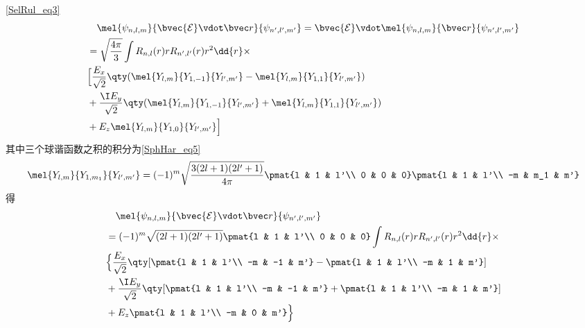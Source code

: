 

\autoref{SelRul_eq3}~
\begin{equation}
\begin{aligned}
&\quad\mel{\psi_{n,l,m}}{\bvec{\mathcal E}\vdot\bvec r}{\psi_{n',l',m'}} = \bvec{\mathcal E}\vdot\mel{\psi_{n,l,m}}{\bvec r}{\psi_{n',l',m'}}\\
&= \sqrt{\frac{4\pi}{3}}\int R_{n,l}(r) r R_{n',l'}(r) r^2 \dd{r}\times\\
&\Big[\frac{E_x}{\sqrt 2} \qty(\mel{Y_{l,m}}{Y_{1,-1}}{Y_{l',m'}} - \mel{Y_{l,m}}{Y_{1,1}}{Y_{l',m'}})\\
&+ \frac{\I E_y}{\sqrt 2} \qty(\mel{Y_{l,m}}{Y_{1,-1}}{Y_{l',m'}} + \mel{Y_{l,m}}{Y_{1,1}}{Y_{l',m'}})\\
&+  E_z \mel{Y_{l,m}}{Y_{1,0}}{Y_{l',m'}}\Big]
\end{aligned}
\end{equation}
其中三个球谐函数之积的积分为\autoref{SphHar_eq5}~
\begin{equation}\label{HDipol_eq1}
\mel{Y_{l,m}}{Y_{1,m_1}}{Y_{l',m'}} = (-1)^m\sqrt{\frac{3(2l+1)(2l'+1)}{4\pi}} \pmat{l & 1 & l'\\ 0 & 0 & 0}\pmat{l & 1 & l'\\ -m & m_1 & m'}
\end{equation}
得
\begin{equation}
\begin{aligned}
&\quad\mel{\psi_{n,l,m}}{\bvec{\mathcal E}\vdot\bvec r}{\psi_{n',l',m'}}\\
&= (-1)^m\sqrt{(2l+1)(2l'+1)} \pmat{l & 1 & l'\\ 0 & 0 & 0} \int R_{n,l}(r) r R_{n',l'}(r) r^2 \dd{r}\times\\
&\Big\{\frac{E_x}{\sqrt 2} \qty[\pmat{l & 1 & l'\\ -m & -1 & m'} - \pmat{l & 1 & l'\\ -m & 1 & m'}]\\
&+ \frac{\I E_y}{\sqrt 2} \qty[\pmat{l & 1 & l'\\ -m & -1 & m'} + \pmat{l & 1 & l'\\ -m & 1 & m'}]\\
&+  E_z \pmat{l & 1 & l'\\ -m & 0 & m'}\Big\}
\end{aligned}
\end{equation}
